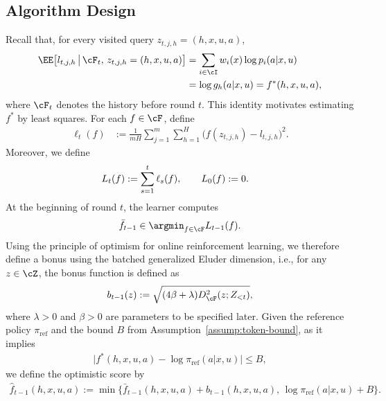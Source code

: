 \documentclass[11pt]{article}
\newcommand{\piref}{\pi_{\text{ref}}}
\begin{document}
\subsection{Algorithm Design}
Recall that, for every visited query
$z_{t,j,h}=(h,x,u,a)$,
\begin{align}
    \EE\big[
        l_{t,j,h}
        \,\big|\,
        \cF_t,\,
        z_{t,j,h}=(h,x,u,a)
    \big]
    &=
    \sum_{i\in\cI}
    w_i(x)\log p_i(a|x,u)
    \notag\\
    &=
    \log g_h(a|x,u)
    =
    f^*(h,x,u,a),
    \label{eq:fa-rkl-conditional-mean}
\end{align}
where $\cF_t$ denotes the history before round $t$.
This identity motivates estimating $f^*$ by least squares. For each $f\in\cF$, define
\begin{align}
    \ell_t(f)
    &:=
    \frac{1}{mH}
    \sum_{j=1}^{m}\sum_{h=1}^{H}
    \bigl(f(z_{t,j,h})-l_{t,j,h}\bigr)^2.
    \label{eq:fa-rkl-regression-loss}
\end{align}
Moreover, we define
\begin{align}
    L_t(f)
    &:=
    \sum_{s=1}^{t}\ell_s(f),
    \qquad L_0(f):=0.
    \notag
\end{align}
At the beginning of round $t$, the learner computes
\begin{align}
    \bar f_{t-1}
    \in
    \argmin_{f\in\cF}L_{t-1}(f).
    \label{eq:fa-rkl-erm}
\end{align}
Using the principle of optimism for online reinforcement learning, we therefore define a bonus using the batched generalized Eluder dimension, i.e., for any $z\in\cZ$, the bonus function is defined as
\begin{align}
    b_{t-1}(z)
    :=
    \sqrt{
        (4\beta+\lambda)
        D_{\cF}^{2}(z;Z_{<t})
    },
    \label{eq:fa-rkl-bonus}
\end{align}
where $\lambda>0$ and $\beta>0$ are parameters to be specified later. Given the reference policy $\piref$ and the bound $B$
from Assumption~\ref{assump:token-bound}, as it implies
\begin{align*}
    \big|
        f^*(h,x,u,a)-\log\piref(a|x,u)
    \big|
    \leq B,
\end{align*}
we define the optimistic score by
\begin{align}
    \hat f_{t-1}(h,x,u,a)
    :=
    \min\Big\{
        \bar f_{t-1}(h,x,u,a)
        +b_{t-1}(h,x,u,a),\,
        \log\piref(a|x,u)+B
    \Big\}.
    \label{eq:fa-rkl-optimistic-score}
\end{align}
\end{document}
